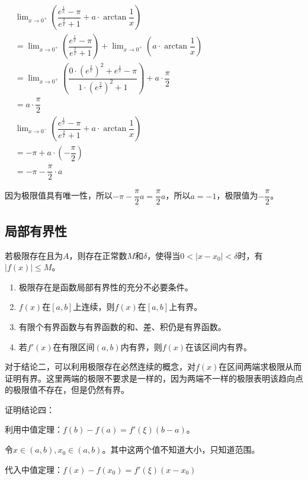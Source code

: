 \documentclass[UTF8]{ctexart}
\begin{document}
$
\begin{aligned}
    & \lim_{x\to 0^+}\left(\dfrac{e^{\frac{1}{x}}-\pi}{e^{\frac{2}{x}}+1}+a\cdot\arctan\dfrac{1}{x}\right) \\
    & = \lim_{x\to 0^+}\left(\dfrac{e^{\frac{1}{x}}-\pi}{e^{\frac{2}{x}}+1}\right)+\lim_{x\to 0^+}\left(a\cdot\arctan\dfrac{1}{x}\right) \\
    & = \lim_{x\to 0^+}\left(\dfrac{0\cdot\left(e^{\frac{2}{x}}\right)^2+e^{\frac{1}{x}}-\pi}{1\cdot\left(e^{\frac{2}{x}}\right)^2+1}\right)+a\cdot\dfrac{\pi}{2} \\
    & = a\cdot\dfrac{\pi}{2} \\
    & \lim_{x\to 0^-}\left(\dfrac{e^{\frac{1}{x}}-\pi}{e^{\frac{2}{x}}+1}+a\cdot\arctan\dfrac{1}{x}\right) \\
    & = -\pi+a\cdot\left(-\dfrac{\pi}{2}\right) \\
    & = -\pi-\dfrac{\pi}{2}\cdot a
\end{aligned}
$

因为极限值具有唯一性，所以$-\pi-\dfrac{\pi}{2}a=\dfrac{\pi}{2}a$，所以$a=-1$，极限值为$-\dfrac{\pi}{2}$。

\subsection{局部有界性}

若极限存在且为$A$，则存在正常数$M$和$\delta$，使得当$0<\vert x-x_0\vert<\delta$时，有$\vert f(x)\vert\leqslant M$。

\begin{enumerate}
    \item 极限存在是函数局部有界性的充分不必要条件。
    \item $f(x)$在$[a,b]$上连续，则$f(x)$在$[a,b]$上有界。
    \item 有限个有界函数与有界函数的和、差、积仍是有界函数。
    \item 若$f'(x)$在有限区间$(a,b)$内有界，则$f(x)$在该区间内有界。
\end{enumerate}

对于结论二，可以利用极限存在必然连续的概念，对$f(x)$在区间两端求极限从而证明有界。这里两端的极限不要求是一样的，因为两端不一样的极限表明该趋向点的极限值不存在，但是仍然有界。

证明结论四：

利用中值定理：$f(b)-f(a)=f'(\xi)(b-a)$。

令$x\in(a,b),x_0\in(a,b)$。其中这两个值不知道大小，只知道范围。

代入中值定理：$f(x)-f(x_0)=f'(\xi)(x-x_0)$
\end{document}
